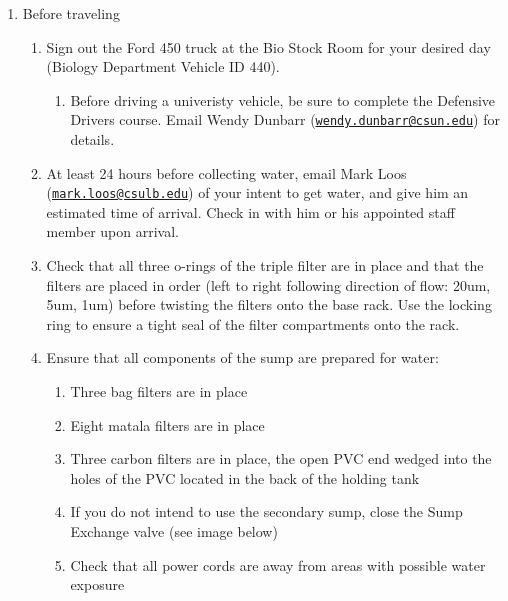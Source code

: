\documentclass[
]{book}
\providecommand{\tightlist}{%
  \setlength{\itemsep}{0pt}\setlength{\parskip}{0pt}}
\begin{document}
\begin{enumerate}
\def\labelenumi{\arabic{enumi}.}
\item
  Before traveling

  \begin{enumerate}
  \def\labelenumii{\arabic{enumii}.}
  \tightlist
  \item
    Sign out the Ford 450 truck at the Bio Stock Room for your desired day (Biology Department Vehicle ID 440).

    \begin{enumerate}
    \def\labelenumiii{\arabic{enumiii}.}
    \tightlist
    \item
      Before driving a univeristy vehicle, be sure to complete the Defensive Drivers course. Email Wendy Dunbarr (\href{mailto:wendy.dunbarr@csun.edu}{\nolinkurl{wendy.dunbarr@csun.edu}}) for details.
    \end{enumerate}
  \item
    At least 24 hours before collecting water, email Mark Loos (\href{mailto:mark.loos@csulb.edu}{\nolinkurl{mark.loos@csulb.edu}}) of your intent to get water, and give him an estimated time of arrival. Check in with him or his appointed staff member upon arrival.
  \item
    Check that all three o-rings of the triple filter are in place and that the filters are placed in order (left to right following direction of flow: 20um, 5um, 1um) before twisting the filters onto the base rack. Use the locking ring to ensure a tight seal of the filter compartments onto the rack.
  \item
    Ensure that all components of the sump are prepared for water:

    \begin{enumerate}
    \def\labelenumiii{\arabic{enumiii}.}
    \tightlist
    \item
      Three bag filters are in place
    \item
      Eight matala filters are in place
    \item
      Three carbon filters are in place, the open PVC end wedged into the holes of the PVC located in the back of the holding tank
    \item
      If you do not intend to use the secondary sump, close the Sump Exchange valve (see image below)
    \item
      Check that all power cords are away from areas with possible water exposure
    \end{enumerate}
  \end{enumerate}


\end{enumerate}
\end{document}
